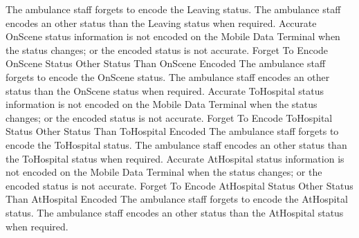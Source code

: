 \stopkaosspec
\startkaosspec
	 {The ambulance staff forgets to encode the Leaving status.}
\stopkaosspec
\startkaosspec
	 {The ambulance staff encodes an other status than the Leaving status when required.}
\stopkaosspec
\startkaosspec
	 {Accurate OnScene status information is not encoded on the Mobile Data Terminal when the status changes; or the encoded status is not accurate.}
	 {Forget To Encode OnScene Status}
	 {Other Status Than OnScene Encoded}
\stopkaosspec
\startkaosspec
	 {The ambulance staff forgets to encode the OnScene status.}
\stopkaosspec
\startkaosspec
	 {The ambulance staff encodes an other status than the OnScene status when required.}
\stopkaosspec
\startkaosspec
	 {Accurate ToHospital status information is not encoded on the Mobile Data Terminal when the status changes; or the encoded status is not accurate.}
	 {Forget To Encode ToHospital Status}
	 {Other Status Than ToHospital Encoded}
\stopkaosspec
\startkaosspec
	 {The ambulance staff forgets to encode the ToHospital status.}
\stopkaosspec
\startkaosspec
	 {The ambulance staff encodes an other status than the ToHospital status when required.}
\stopkaosspec
\startkaosspec
	 {Accurate AtHospital status information is not encoded on the Mobile Data Terminal when the status changes; or the encoded status is not accurate.}
	 {Forget To Encode AtHospital Status}
	 {Other Status Than AtHospital Encoded}
\stopkaosspec
\startkaosspec
	 {The ambulance staff forgets to encode the AtHospital status.}
\stopkaosspec
\startkaosspec
	 {The ambulance staff encodes an other status than the AtHospital status when required.}
\stopkaosspec
\startkaosspec

